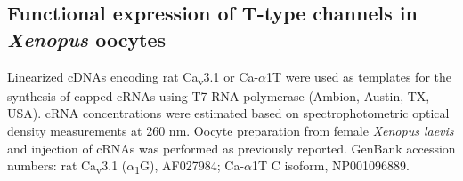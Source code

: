 \subsection*{Functional expression of T-type channels in \emph{Xenopus} oocytes}

Linearized cDNAs encoding rat Ca\textsubscript{v}3.1 or Ca-$\alpha$1T were used as templates for the synthesis of capped cRNAs using T7 RNA polymerase (Ambion, Austin, TX, USA).
cRNA concentrations were estimated based on spectrophotometric optical density measurements at 260 nm.
Oocyte preparation from female \emph{Xenopus laevis} and injection of cRNAs was performed as previously reported\cite{kang:2006aa}.
GenBank accession numbers: rat Ca\textsubscript{v}3.1 ($\alpha$\textsubscript{1}G), AF027984\cite{PerezReyes:1998gn}; Ca-$\alpha$1T C isoform, NP001096889.
